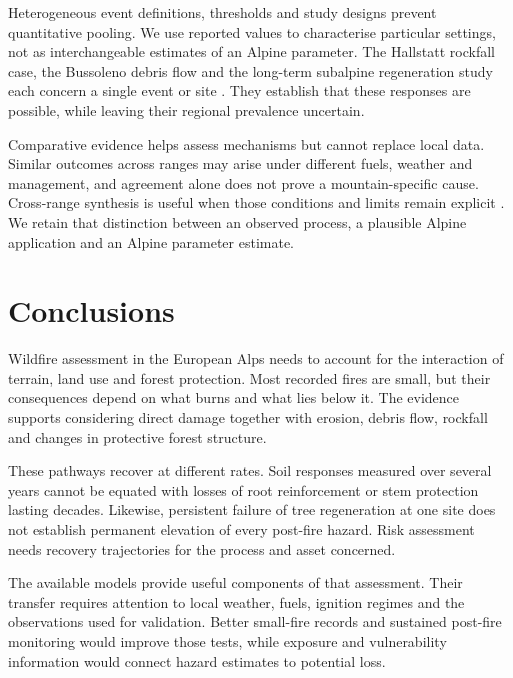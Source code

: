 \documentclass[11pt,a4paper]{article}
\begin{document}
Heterogeneous event definitions, thresholds and study designs prevent quantitative pooling. We use reported values to characterise particular settings, not as interchangeable estimates of an Alpine parameter. The Hallstatt rockfall case, the Bussoleno debris flow and the long-term subalpine regeneration study each concern a single event or site \citep{melzner_brief_2019, laporta_postwildfire_2025, degiuli_arrested_2024}. They establish that these responses are possible, while leaving their regional prevalence uncertain.

Comparative evidence helps assess mechanisms but cannot replace local data. Similar outcomes across ranges may arise under different fuels, weather and management, and agreement alone does not prove a mountain-specific cause. Cross-range synthesis is useful when those conditions and limits remain explicit \citep{payne_nature_2020}. We retain that distinction between an observed process, a plausible Alpine application and an Alpine parameter estimate.

\section{Conclusions}
\label{sec:conclusions}

Wildfire assessment in the European Alps needs to account for the interaction of terrain, land use and forest protection. Most recorded fires are small, but their consequences depend on what burns and what lies below it. The evidence supports considering direct damage together with erosion, debris flow, rockfall and changes in protective forest structure.

These pathways recover at different rates. Soil responses measured over several years cannot be equated with losses of root reinforcement or stem protection lasting decades. Likewise, persistent failure of tree regeneration at one site does not establish permanent elevation of every post-fire hazard. Risk assessment needs recovery trajectories for the process and asset concerned.

The available models provide useful components of that assessment. Their transfer requires attention to local weather, fuels, ignition regimes and the observations used for validation. Better small-fire records and sustained post-fire monitoring would improve those tests, while exposure and vulnerability information would connect hazard estimates to potential loss.
\end{document}
